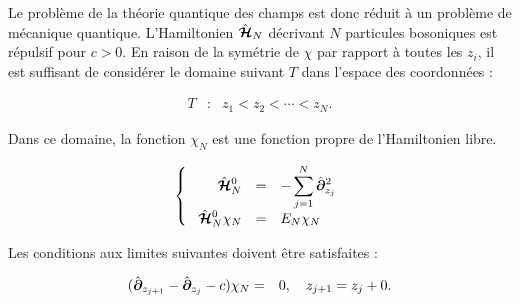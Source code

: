 Le problème de la théorie quantique des champs est donc réduit à un problème de mécanique quantique. L'Hamiltonien $\hat{\bm{\mathcal{H}}}_N$ décrivant \(N\) particules bosoniques est répulsif pour \(c > 0\). En raison de la symétrie de \(\chi\) par rapport à toutes les \(z_i\), il est suffisant de considérer le domaine suivant \(T\) dans l'espace des coordonnées :

\begin{eqnarray}
	T & : & z_1 < z_2 < \cdots < z_N \label{eq.1.13}. 
\end{eqnarray}

Dans ce domaine, la fonction \(\chi_N\) est une fonction propre de l'Hamiltonien libre.

\begin{eqnarray}
	\left \{ \begin{array}{rcl} \operator{\mathcal{H}}_N^0 & = & \displaystyle - \sum_{j=1}^N \operator{\partial}_{z_j}^2 \\  \operator{\mathcal{H}}_N^0 \chi_N  & = & E_N \chi_N  \end{array} \right .	\label{eq.1.14}
\end{eqnarray}

Les conditions aux limites suivantes doivent être satisfaites :

\begin{eqnarray}
	( \hat{\bm{\partial}}_{z_{j+1}}	- \hat{\bm{\partial}}_{z_{j}} - c ) \chi_N &= & 0 , \quad z_{j+1} = z_j + 0 .\label{eq.1.15}
\end{eqnarray}

